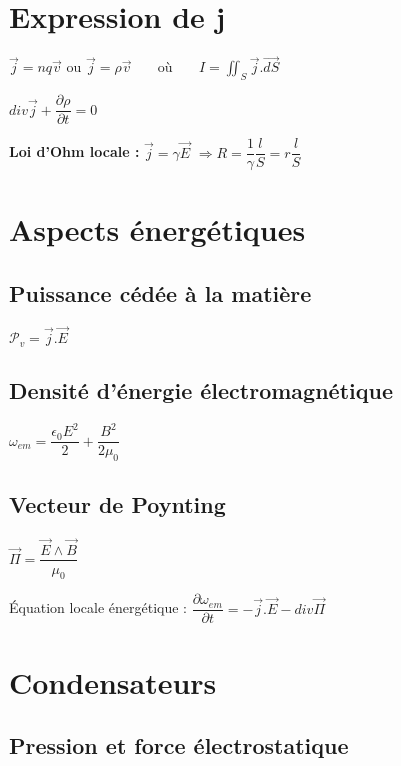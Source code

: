 \documentclass[9pt]{article}
\begin{document}
\begin{multicols*}{2}
\section{Expression de j}

$\overrightarrow{j}=nq\overrightarrow{v}$ ou $\overrightarrow{j}=\rho\overrightarrow{v} \> \> \> \> \> \> \>$ où $ \> \> \> \> \> \> \>I=\displaystyle\iint_S \overrightarrow{j}.\overrightarrow{dS}$

$\boxed{div\overrightarrow{j} + \dfrac{\partial\rho}{\partial t} = 0}$

\textbf{Loi d'Ohm locale :} $\boxed{\overrightarrow{j}=\gamma\overrightarrow{E}}$ $\Rightarrow R=\dfrac{1}{\gamma}\dfrac{l}{S}=r\dfrac{l}{S}$


\section{Aspects énergétiques}

\subsection{Puissance cédée à la matière}

$\mathscr{P}_{v}=\overrightarrow{j}.\overrightarrow{E}$

\subsection{Densité d'énergie électromagnétique}

$\omega_{em}=\dfrac{\epsilon_{0}E^{2}}{2}+\dfrac{B^{2}}{2\mu_{0}}$

\subsection{Vecteur de Poynting}

$\boxed{\overrightarrow{\Pi}=\dfrac{\overrightarrow{E}\wedge\overrightarrow{B}}{\mu_{0}}}$  $\> \>$

 Équation locale énergétique : $\dfrac{\partial\omega_{em}}{\partial t} = -\overrightarrow{j}.\overrightarrow{E}-div \overrightarrow{\Pi}$
 
 
\section{Condensateurs}

\subsection{Pression et force électrostatique}


\end{multicols*}
\end{document}

